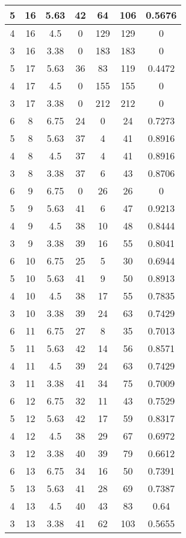 \documentclass[letterpaper, 12pt]{article}
\begin{document}
\begin{longtable}{|c|c|c|c|c|c|c|}
\hline
5 & 16 & 5.63 & 42 & 64 & 106 & 0.5676 \\
\hline
4 & 16 & 4.5 & 0 & 129 & 129 & 0 \\
\hline
3 & 16 & 3.38 & 0 & 183 & 183 & 0 \\
\hline
5 & 17 & 5.63 & 36 & 83 & 119 & 0.4472 \\
\hline
4 & 17 & 4.5 & 0 & 155 & 155 & 0 \\
\hline
3 & 17 & 3.38 & 0 & 212 & 212 & 0 \\
\hline
6 & 8 & 6.75 & 24 & 0 & 24 & 0.7273 \\
\hline
5 & 8 & 5.63 & 37 & 4 & 41 & 0.8916 \\
\hline
4 & 8 & 4.5 & 37 & 4 & 41 & 0.8916 \\
\hline
3 & 8 & 3.38 & 37 & 6 & 43 & 0.8706 \\
\hline
6 & 9 & 6.75 & 0 & 26 & 26 & 0 \\
\hline
5 & 9 & 5.63 & 41 & 6 & 47 & 0.9213 \\
\hline
4 & 9 & 4.5 & 38 & 10 & 48 & 0.8444 \\
\hline
3 & 9 & 3.38 & 39 & 16 & 55 & 0.8041 \\
\hline
6 & 10 & 6.75 & 25 & 5 & 30 & 0.6944 \\
\hline
5 & 10 & 5.63 & 41 & 9 & 50 & 0.8913 \\
\hline
4 & 10 & 4.5 & 38 & 17 & 55 & 0.7835 \\
\hline
3 & 10 & 3.38 & 39 & 24 & 63 & 0.7429 \\
\hline
6 & 11 & 6.75 & 27 & 8 & 35 & 0.7013 \\
\hline
5 & 11 & 5.63 & 42 & 14 & 56 & 0.8571 \\
\hline
4 & 11 & 4.5 & 39 & 24 & 63 & 0.7429 \\
\hline
3 & 11 & 3.38 & 41 & 34 & 75 & 0.7009 \\
\hline
6 & 12 & 6.75 & 32 & 11 & 43 & 0.7529 \\
\hline
5 & 12 & 5.63 & 42 & 17 & 59 & 0.8317 \\
\hline
4 & 12 & 4.5 & 38 & 29 & 67 & 0.6972 \\
\hline
3 & 12 & 3.38 & 40 & 39 & 79 & 0.6612 \\
\hline
6 & 13 & 6.75 & 34 & 16 & 50 & 0.7391 \\
\hline
5 & 13 & 5.63 & 41 & 28 & 69 & 0.7387 \\
\hline
4 & 13 & 4.5 & 40 & 43 & 83 & 0.64 \\
\hline
3 & 13 & 3.38 & 41 & 62 & 103 & 0.5655 \\
\hline

\end{longtable}
\end{document}

